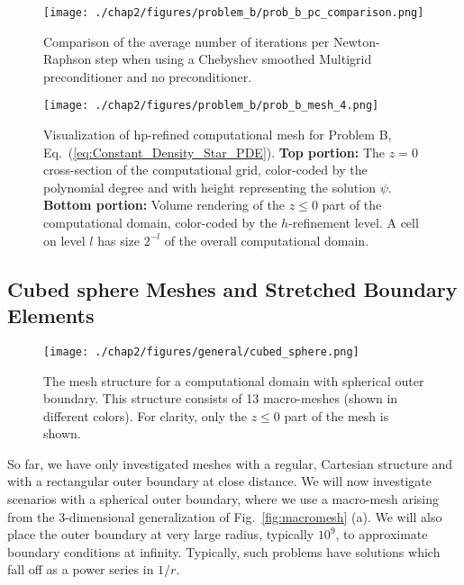 \begin{figure}
  \centering
  \texttt{[image: ./chap2/figures/problem\_b/prob\_b\_pc\_comparison.png]}
  \caption{Comparison of the average number of iterations per Newton-Raphson step when using a Chebyshev smoothed Multigrid preconditioner and no preconditioner.}
  \label{fig:problem_b_pc_comparison} 
\end{figure}


\begin{figure}
  \centering
  \texttt{[image: ./chap2/figures/problem\_b/prob\_b\_mesh\_4.png]}
  \caption{ \label{fig:problem_b_mesh} Visualization of
      hp-refined computational mesh for Problem B,
      Eq.~(\ref{eq:Constant_Density_Star_PDE}).  {\bf Top portion:}
      The $z=0$ cross-section of the computational grid, color-coded
      by the polynomial degree and with height representing the
      solution $\psi$.  {\bf Bottom portion:} Volume rendering of the
      $z\le 0$ part of the computational domain, color-coded by the
      $h$-refinement level.  A cell on level $l$ has size $2^{-l}$ of
      the overall computational domain. }
\end{figure}

%


\subsection{Cubed sphere Meshes and Stretched Boundary Elements}
  \label{sec:CompactifiedLorentizan}

\begin{figure}
  \centering
  \texttt{[image: ./chap2/figures/general/cubed\_sphere.png]}
  \caption{
The mesh structure for a computational domain with spherical outer boundary.  This structure consists of 13 macro-meshes (shown in different colors).  For clarity, only the $z\le 0$ part of the mesh is shown. }
  \label{fig:cubed_sphere_mesh}
\end{figure}

So far, we have only investigated meshes with a regular,
  Cartesian structure and with a rectangular outer boundary at close
  distance.  We will now investigate scenarios with a spherical outer
  boundary, where we use a macro-mesh arising from the 3-dimensional
  generalization of Fig.~\ref{fig:macromesh} (a).  We will also place
  the outer boundary at very large radius, typically $10^9$, to
  approximate boundary conditions at infinity. Typically, such problems have solutions which fall off as a
power series in $1/r$.

